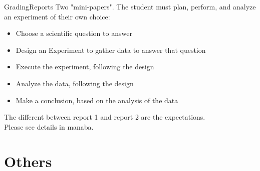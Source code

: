 \documentclass[aspectratio=169]{beamer}
\begin{document}
\begin{frame}{Grading}{Reports}
  Two "mini-papers". The student must plan, perform, and analyze an experiment of their own choice:\bigskip

  \begin{itemize}
    \item Choose a scientific question to answer
    \item Design an Experiment to gather data to answer that question
    \item Execute the experiment, following the design
    \item Analyze the data, following the design
    \item Make a conclusion, based on the analysis of the data
  \end{itemize}\bigskip

  The different between report 1 and report 2 are the expectations.\\ Please see details in manaba.
\end{frame}

\section{Others}



\end{document}
